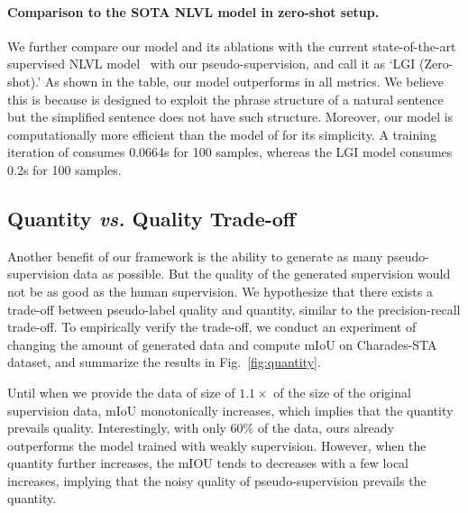 \vspace{-1em}\paragraph{Comparison to the SOTA NLVL model in zero-shot setup.}
We further compare our model and its ablations with the current state-of-the-art supervised NLVL model~\cite{mun2020LGI} with our pseudo-supervision, and call it as `LGI (Zero-shot).'
%
As shown in the table, our model outperforms \cite{mun2020LGI} in all metrics.
We believe this is because \cite{mun2020LGI} is designed to exploit the phrase structure of a natural sentence but the simplified sentence does not have such structure.
Moreover, our model is computationally more efficient than the model of \cite{mun2020LGI} for its simplicity. A training iteration of \method consumes 0.0664s for 100 samples, whereas the LGI model consumes 0.2s for 100 samples.



\subsection{Quantity \emph{vs.} Quality Trade-off}
\label{sec:exp_qualquantradeoff}
Another benefit of our framework is the ability to generate as many pseudo-supervision data as possible.
But the quality of the generated supervision would not be as good as the human supervision.
We hypothesize that there exists a trade-off between pseudo-label quality and quantity, similar to the precision-recall trade-off.
To empirically verify the trade-off, we conduct an experiment of changing the amount of generated data and compute mIoU on Charades-STA dataset, and summarize the results in Fig.~\ref{fig:quantity}.

Until when we provide the data of size of $1.1\times$ of the size of the original supervision data, mIoU monotonically increases, which implies that the quantity prevails quality.
Interestingly, with only 60\% of the data, ours already outperforms the model trained with weakly supervision.
However, when the quantity further increases, the mIOU tends to decreases with a few local increases, implying that the noisy quality of pseudo-supervision prevails the quantity.



